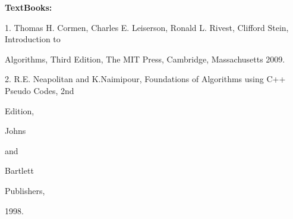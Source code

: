 \documentclass[12pt,a4paper]{article}
\begin{document}
\textbf{TextBooks:}\par\vspace{2pt}
1. Thomas H. Cormen, Charles E. Leiserson, Ronald L. Rivest, Clifford Stein, Introduction to\par
Algorithms, Third Edition, The MIT Press, Cambridge, Massachusetts 2009.\par
2. R.E. Neapolitan and K.Naimipour, Foundations of Algorithms using C++ Pseudo Codes, 2nd\par
Edition,\par
Johns\par
and\par
Bartlett\par
Publishers,\par
1998.\par
\vspace{4pt}
\end{document}
